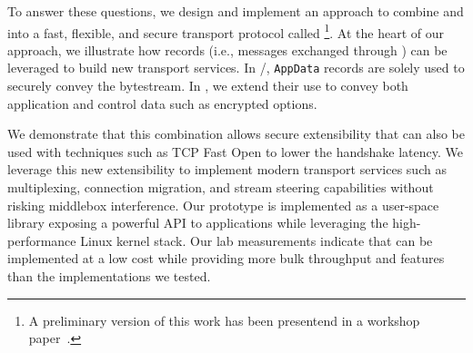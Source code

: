 To answer these questions, we design and implement an approach to combine
\tcp and  into a fast, flexible, and secure transport protocol called \textbf{\tcpls}
%
\footnote{A preliminary version of this work has been presentend in a workshop
  paper~\cite{rochet2020tcpls}.}.  At the heart of our approach, we illustrate
how \tls records (i.e., messages exchanged through \tls) can be leveraged to build new transport services. In \tcp/\tls, \tls \texttt{AppData} records are solely used to securely convey the \tcp bytestream. In \tcpls, we extend their use to convey both application and control data such as encrypted \tcp options.

We demonstrate that this combination allows secure extensibility that can also
be used with techniques such as TCP Fast Open \cite{rfc7413} to lower the
handshake latency. We leverage this new extensibility to implement modern transport
services such as multiplexing, connection migration, and stream steering capabilities
without risking middlebox interference. Our \tcpls prototype is implemented as a
user-space library exposing a powerful API to applications %
while leveraging the
high-performance Linux kernel \tcp stack. Our lab measurements indicate that
\tcpls can be implemented at a low cost while providing more bulk throughput and
features than the \quic implementations we tested.



